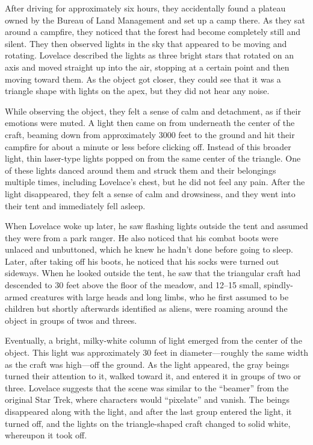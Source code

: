 After driving for approximately six hours, they accidentally found a plateau owned by the Bureau of Land Management and set up a camp there. As they sat around a campfire, they noticed that the forest had become completely still and silent. They then observed lights in the sky that appeared to be moving and rotating. Lovelace described the lights as three bright stars that rotated on an axis and moved straight up into the air, stopping at a certain point and then moving toward them. As the object got closer, they could see that it was a triangle shape with lights on the apex, but they did not hear any noise.

While observing the object, they felt a sense of calm and detachment, as if their emotions were muted. A light then came on from underneath the center of the craft, beaming down from approximately 3000 feet to the ground and hit their campfire for about a minute or less before clicking off. Instead of this broader light, thin laser-type lights popped on from the same center of the triangle. One of these lights danced around them and struck them and their belongings multiple times, including Lovelace's chest, but he did not feel any pain. After the light disappeared, they felt a sense of calm and drowsiness, and they went into their tent and immediately fell asleep.

When Lovelace woke up later, he saw flashing lights outside the tent and assumed they were from a park ranger. He also noticed that his combat boots were unlaced and unbuttoned, which he knew he hadn't done before going to sleep. Later, after taking off his boots, he noticed that his socks were turned out sideways. When he looked outside the tent, he saw that the triangular craft had descended to 30 feet above the floor of the meadow, and 12--15 small, spindly-armed creatures with large heads and long limbs, who he first assumed to be children but shortly afterwards identified as aliens, were roaming around the object in groups of twos and threes.

Eventually, a bright, milky-white column of light emerged from the center of the object. This light was approximately 30 feet in diameter---roughly the same width as the craft was high---off the ground. As the light appeared, the gray beings turned their attention to it, walked toward it, and entered it in groups of two or three. Lovelace suggests that the scene was similar to the ``beamer'' from the original Star Trek, where characters would ``pixelate'' and vanish. The beings disappeared along with the light, and after the last group entered the light, it turned off, and the lights on the triangle-shaped craft changed to solid white, whereupon it took off.

